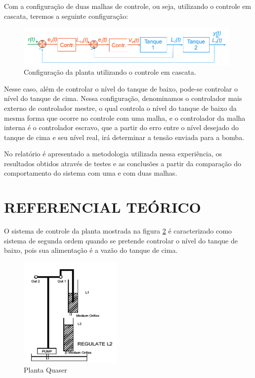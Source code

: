 \documentclass[a4paper,12pt]{article}
\begin{document}
\begin{flushleft}
\hspace{4ex}Com a configuração de duas malhas de controle, ou seja, utilizando o controle em cascata, teremos a seguinte configuração:

\begin{figure}[H]
\centering
\includegraphics[width=11cm]{ImagensLab4/duasmalhas.png}
\caption{Configuração da planta utilizando o controle em cascata.}
\label{duasmalha}
\end{figure}

\hspace{4ex}Nesse caso, além de controlar o nível do tanque de baixo, pode-se controlar o nível do tanque de cima. Nessa configuração, denominamos o controlador mais externo de controlador mestre, o qual controla o nível do tanque de baixo da mesma forma que ocorre no controle com uma malha, e o controlador da malha interna é o controlador escravo, que a partir do erro entre o nível desejado do tanque de cima e seu nível real, irá determinar a tensão enviada para a bomba.

\hspace{4ex}No relatório é apresentado a metodologia utilizada nessa experiência, os resultados obtidos através de testes e as conclusões a partir da comparação do comportamento do sistema com uma e com duas malhas.

\end{flushleft}

\newpage


\thispagestyle{main}

\section{REFERENCIAL TEÓRICO}

\hspace{4ex}O sistema de controle da planta mostrada na figura \ref{quaser} é caracterizado como sistema de segunda ordem quando se pretende controlar o nível do tanque de baixo, pois sua alimentação é a vazão do tanque de cima.

\begin{figure}[h]
\centering
\includegraphics[width=5cm]{fotosLab3/planta.png}
\caption{Planta Quaser}
\label{quaser}
\end{figure}
\end{document}
